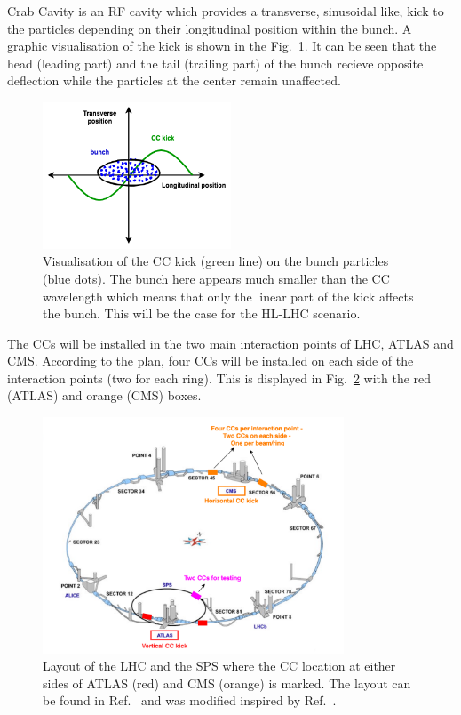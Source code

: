 Crab Cavity is an RF cavity which provides a transverse, sinusoidal like, kick to the particles depending on their longitudinal position within the bunch. A graphic visualisation of the kick is shown in the Fig.~\ref{fig:cc_simple_kick}. It can be seen that the head (leading part) and the tail (trailing part) of the bunch recieve opposite deflection while the particles at the center remain unaffected.

\begin{figure}[!h] %
    \centering         
    \includegraphics[width=0.5\textwidth]{images/introduction/sin_CC_kick_LHC_beams.drawio.png}
        \caption{Visualisation of the CC kick (green line) on the bunch particles (blue dots). The bunch here appears much smaller than the CC wavelength which means that only the linear part of the kick affects the bunch. This will be the case for the HL-LHC scenario.}
        \label{fig:cc_simple_kick}
 \end{figure}


The CCs will be installed in the two main interaction points of LHC, ATLAS and CMS. According to the plan, four CCs will be installed on each side of the interaction points (two for each ring). This is displayed in Fig.~\ref{fig:LHC_layout_CCs} with the red (ATLAS) and orange (CMS) boxes. 

\begin{figure}[!h] %
    \centering         
    \includegraphics[width=0.8\textwidth]{images/introduction/LHC_layout_CCs.png}
        \caption{Layout of the LHC and the SPS where the CC location at either sides of ATLAS (red) and CMS (orange) is marked.  The layout can be found in Ref.~\cite{LHC_SPS_layout} and was modified inspired by Ref.~\cite{LHC_SPS_layout_v2}.}
        \label{fig:LHC_layout_CCs}
 \end{figure}

